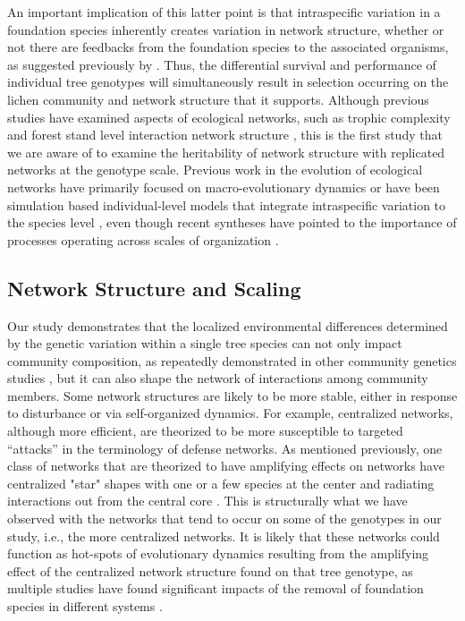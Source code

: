 \documentclass[fleqn,12pt]{olplainarticle}
\begin{document}
An important implication of this latter point is that intraspecific
variation in a foundation species inherently creates variation in
network structure, whether or not there are feedbacks from the
foundation species to the associated organisms, as suggested
previously by \cite{Lau2016afix}. Thus, the differential survival and
performance of individual tree genotypes will simultaneously result in
selection occurring on the lichen community and network structure that
it supports. Although previous studies have examined aspects of
ecological networks, such as trophic complexity
\citep{Barbour2016GeneticComplexity} and forest stand level
interaction network structure \citep{Lau2016afix,
  Keith2017}, this is the first study that we are aware of to examine
the heritability of network structure with replicated networks at the
genotype scale. Previous work in the evolution of ecological networks
have primarily focused on macro-evolutionary dynamics
\citep{Rezende2007, Weber2017EvolutionMacroevolution,
  Valverde2018TheSpandrel, Harmon2019DetectingInteractions} or have
been simulation based individual-level models that integrate
intraspecific variation to the species level
\citep{Maliet2020AnNetworks}, even though recent syntheses have
pointed to the importance of processes operating across scales of
organization \citep{Guimaraes2020afix}.


\subsection*{Network Structure and Scaling}

Our study demonstrates that the localized environmental differences
determined by the genetic variation within a single tree species can
not only impact community composition, as repeatedly demonstrated in
other community genetics studies \citep{Whitham2006a,
  DesRoches2018TheVariation}, but it can also shape the network of
interactions among community members. Some network structures are
likely to be more stable, either in response to disturbance or via
self-organized dynamics. For example, centralized networks, although
more efficient, are theorized to be more susceptible to targeted
``attacks'' in the terminology of defense networks. As mentioned
previously, one class of networks that are theorized to have
amplifying effects on networks have centralized "star" shapes with one
or a few species at the center and radiating interactions out from the
central core \citep{Lieberman2005EvolutionaryGraphs}. This is
structurally what we have observed with the networks that tend to
occur on some of the genotypes in our study, i.e., the more
centralized networks. It is likely that these networks could function
as hot-spots of evolutionary dynamics resulting from the amplifying
effect of the centralized network structure found on that tree
genotype, as multiple studies have found significant impacts of the
removal of foundation species in different systems \citep{Keith2017,
  DesRoches2018TheVariation}.
\end{document}
